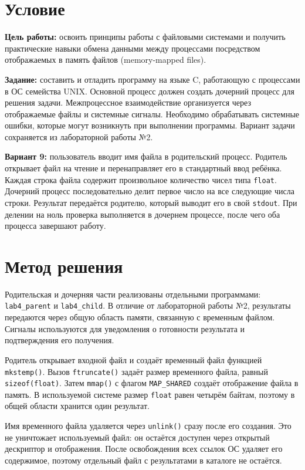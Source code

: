 \documentclass[12pt, a4paper]{article}
\begin{document}


\section{Условие}

\textbf{Цель работы:} освоить принципы работы с файловыми системами и получить практические навыки обмена данными между процессами посредством отображаемых в память файлов (memory-mapped files).

\textbf{Задание:} составить и отладить программу на языке C, работающую с процессами в ОС семейства UNIX. Основной процесс должен создать дочерний процесс для решения задачи. Межпроцессное взаимодействие организуется через отображаемые файлы и системные сигналы. Необходимо обрабатывать системные ошибки, которые могут возникнуть при выполнении программы. Вариант задачи сохраняется из лабораторной работы №2.

\textbf{Вариант 9:} пользователь вводит имя файла в родительский процесс. Родитель открывает файл на чтение и перенаправляет его в стандартный ввод ребёнка. Каждая строка файла содержит произвольное количество чисел типа \texttt{float}. Дочерний процесс последовательно делит первое число на все следующие числа строки. Результат передаётся родителю, который выводит его в свой \texttt{stdout}. При делении на ноль проверка выполняется в дочернем процессе, после чего оба процесса завершают работу.

\section{Метод решения}

Родительская и дочерняя части реализованы отдельными программами: \texttt{lab4\_parent} и \texttt{lab4\_child}. В отличие от лабораторной работы №2, результаты передаются через общую область памяти, связанную с временным файлом. Сигналы используются для уведомления о готовности результата и подтверждения его получения.

Родитель открывает входной файл и создаёт временный файл функцией \texttt{mkstemp()}. Вызов \texttt{ftruncate()} задаёт размер временного файла, равный \texttt{sizeof(float)}. Затем \texttt{mmap()} с флагом \texttt{MAP\_SHARED} создаёт отображение файла в память. В используемой системе размер \texttt{float} равен четырём байтам, поэтому в общей области хранится один результат.

Имя временного файла удаляется через \texttt{unlink()} сразу после его создания. Это не уничтожает используемый файл: он остаётся доступен через открытый дескриптор и отображения. После освобождения всех ссылок ОС удаляет его содержимое, поэтому отдельный файл с результатами в каталоге не остаётся.
\end{document}
